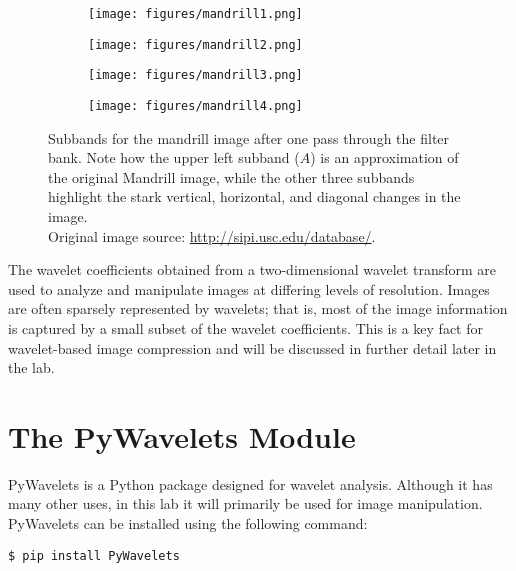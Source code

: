 \begin{figure}[H]
\centering
        \begin{subfigure}{0.4\textwidth}\centering
                    \texttt{[image: figures/mandrill1.png]}
       \end{subfigure}%
        \begin{subfigure}{0.4\textwidth}\centering
                    \texttt{[image: figures/mandrill2.png]}
       \end{subfigure}%
    \hfill
        \begin{subfigure}{0.4\textwidth}\centering
                    \texttt{[image: figures/mandrill3.png]}
       \end{subfigure}%
        \begin{subfigure}{0.4\textwidth}\centering
                    \texttt{[image: figures/mandrill4.png]}
       \end{subfigure}
    \caption{Subbands for the mandrill image after one pass through the filter bank.
    Note how the upper left subband ($A$) is an approximation of the original Mandrill image, while the other
    three subbands highlight the stark vertical, horizontal, and diagonal changes in the image.\\
    Original image source: \url{http://sipi.usc.edu/database/}.}
    \label{fig:dwt2D}
\end{figure}

The wavelet coefficients obtained from a two-dimensional wavelet transform are used to analyze and manipulate images at differing levels of resolution.
Images are often sparsely represented by wavelets; that is, most of the image information is captured by a small subset of the wavelet coefficients.
This is a key fact for wavelet-based image compression and will be discussed in further detail later in the lab.

\section*{The PyWavelets Module} %

PyWavelets is a Python package designed for wavelet analysis.
Although it has many other uses, in this lab it will primarily be used for image manipulation.
PyWavelets can be installed using the following command:
\begin{lstlisting}
$ pip install PyWavelets
\end{lstlisting}

